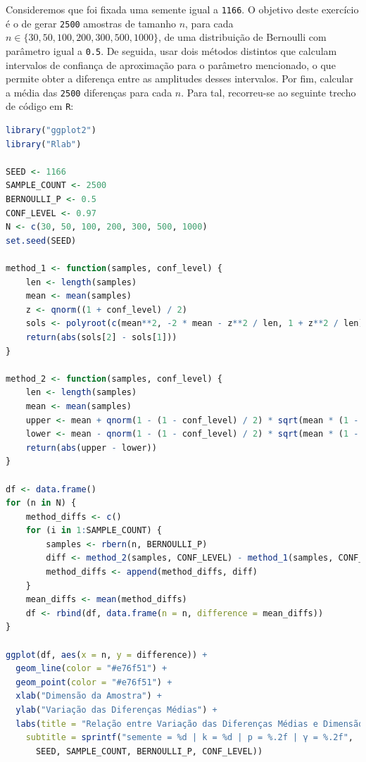 \documentclass[12pt,a4paper]{article}
\begin{document}
Consideremos que foi fixada uma semente igual a \texttt{1166}.
O objetivo deste exercício é o de gerar \texttt{2500} amostras de tamanho $n$, para cada $ n \in \{30, 50, 100, 200, 300, 500, 1000\}$, de uma distribuição de Bernoulli com parâmetro igual a \texttt{0.5}.
De seguida, usar dois métodos distintos que calculam intervalos de confiança de aproximação para o parâmetro mencionado, o que permite obter a diferença entre as amplitudes desses intervalos.
Por fim, calcular a média das \texttt{2500} diferenças para cada $n$.
Para tal, recorreu-se ao seguinte trecho de código em \texttt{R}:

\quad

\begin{lstlisting}[language=R]
library("ggplot2")
library("Rlab")

SEED <- 1166
SAMPLE_COUNT <- 2500
BERNOULLI_P <- 0.5
CONF_LEVEL <- 0.97
N <- c(30, 50, 100, 200, 300, 500, 1000)
set.seed(SEED)

method_1 <- function(samples, conf_level) {
    len <- length(samples)
    mean <- mean(samples)
    z <- qnorm((1 + conf_level) / 2)
    sols <- polyroot(c(mean**2, -2 * mean - z**2 / len, 1 + z**2 / len))
    return(abs(sols[2] - sols[1]))
}

method_2 <- function(samples, conf_level) {
    len <- length(samples)
    mean <- mean(samples)
    upper <- mean + qnorm(1 - (1 - conf_level) / 2) * sqrt(mean * (1 - mean) / len)
    lower <- mean - qnorm(1 - (1 - conf_level) / 2) * sqrt(mean * (1 - mean) / len)
    return(abs(upper - lower))
}

df <- data.frame()
for (n in N) {
    method_diffs <- c()
    for (i in 1:SAMPLE_COUNT) {
        samples <- rbern(n, BERNOULLI_P)
        diff <- method_2(samples, CONF_LEVEL) - method_1(samples, CONF_LEVEL)
        method_diffs <- append(method_diffs, diff)
    }
    mean_diffs <- mean(method_diffs)
    df <- rbind(df, data.frame(n = n, difference = mean_diffs))
}

ggplot(df, aes(x = n, y = difference)) +
  geom_line(color = "#e76f51") +
  geom_point(color = "#e76f51") +
  xlab("Dimensão da Amostra") +
  ylab("Variação das Diferenças Médias") +
  labs(title = "Relação entre Variação das Diferenças Médias e Dimensão da Amostra",
    subtitle = sprintf("semente = %d | k = %d | p = %.2f | γ = %.2f",
      SEED, SAMPLE_COUNT, BERNOULLI_P, CONF_LEVEL))
\end{lstlisting}
\end{document}
